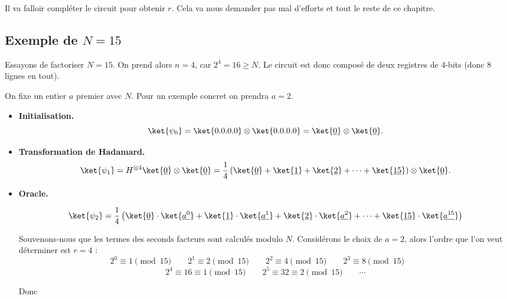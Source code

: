 \documentclass[11pt,class=report,crop=false]{standalone}
\begin{document}
Il va falloir compléter le circuit pour obtenir $r$. Cela va nous demander pas mal d'efforts et tout le reste de ce chapitre.

\subsection{Exemple de $N=15$}

Essayons de factoriser $N=15$.
On prend alors $n=4$, car $2^4 = 16 \ge N$.
Le circuit est donc composé de deux registres de $4$-bits (donc $8$ lignes en tout).


On fixe un entier $a$ premier avec $N$. Pour un exemple concret on prendra $a=2$.

\begin{itemize}
  \item \textbf{Initialisation.}
  $$\ket{\psi_0} 
  = \ket{0.0.0.0} \otimes \ket{0.0.0.0}
  = \ket{\underline{0}} \otimes \ket{\underline{0}}.$$



  \item \textbf{Transformation de Hadamard.} 
$$\ket{\psi_1} 
= H^{\otimes 4}\ket{\underline{0}} \otimes \ket{\underline{0}}
= \frac{1}{4}\left( \ket{\underline{0}} + \ket{\underline{1}}+ \ket{\underline{2}}+\cdots +\ket{\underline{15}} \right) \otimes \ket{\underline{0}}.
$$
 
  \item \textbf{Oracle.}

  $$\ket{\psi_2} = \frac{1}{4} 
\left( \ket{\underline{0}}\cdot\ket{\underline{a^0}} + \ket{\underline{1}}\cdot\ket{\underline{a^1}}+
 \ket{\underline{2}}\cdot\ket{\underline{a^2}}+
\cdots +\ket{\underline{15}}\cdot\ket{\underline{a^{15}}} \right)$$

Souvenons-nous que les termes des seconds facteurs sont calculés modulo $N$.
Considérons le choix de $a=2$, alors l'ordre que l'on veut déterminer est $r=4$ : 
$$
2^0 \equiv 1 \pmod{15} \qquad
2^1 \equiv 2 \pmod{15} \qquad
2^2 \equiv 4 \pmod{15} \qquad
2^3 \equiv 8 \pmod{15} \qquad
$$
$$
2^4 \equiv 16 \equiv 1 \pmod{15} \qquad
2^5 \equiv 32 \equiv 2 \pmod{15} \qquad \cdots
$$



Donc  


\end{itemize}
\end{document}
